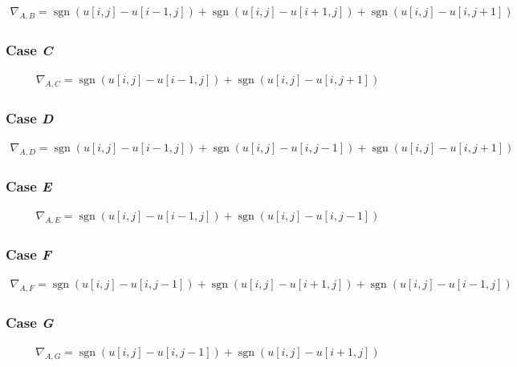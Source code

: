 \documentclass[a4paper]{scrreprt}
\DeclareMathOperator{\sgn}{sgn}
\begin{document}
\begin{align*}
		\nabla_{A, B} = 
		  \sgn(u[i, j] - u[i - 1, j]) + \sgn(u[i, j] - u[i + 1, j]) + \sgn(u[i, j] - u[i, j + 1])
\end{align*}

\subsubsection{Case \emph{C}}

\begin{align*}
		\nabla_{A, C} =
		  \sgn(u[i, j] - u[i - 1, j]) + \sgn(u[i, j] - u[i, j + 1])
\end{align*}

\subsubsection{Case \emph{D}}

\begin{align*}
		\nabla_{A, D} = 
		  \sgn(u[i, j] - u[i - 1, j]) + \sgn(u[i, j] - u[i, j - 1]) + \sgn(u[i, j] - u[i, j + 1])
\end{align*}

\subsubsection{Case \emph{E}}

\begin{align*}
		\nabla_{A, E} =
		  \sgn(u[i, j] - u[i - 1, j]) + \sgn(u[i, j] - u[i, j - 1])
\end{align*}

\subsubsection{Case \emph{F}}

\begin{align*}
		\nabla_{A, F} =
		  \sgn(u[i, j] - u[i, j -1]) + \sgn(u[i, j] - u[i + 1, j]) + \sgn(u[i, j] - u[i - 1, j])
\end{align*}

\subsubsection{Case \emph{G}}

\begin{align*}
		\nabla_{A, G} = 
		  \sgn(u[i, j] - u[i, j -1]) + \sgn(u[i, j] - u[i + 1, j])
\end{align*}
\end{document}
